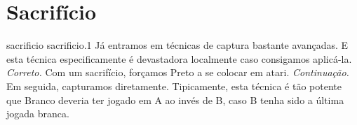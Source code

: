 \chapter{Sacrifício}

\emptypage

\problemAnswerDiagram
  {sacrificio}
  {sacrificio.1}
  {Já entramos em técnicas de captura bastante avançadas. E esta técnica especificamente é devastadora localmente caso consigamos aplicá-la.}
  {\emph{Correto.} Com um sacrifício, forçamos Preto a se colocar em atari.}
  {\emph{Continuação.} Em seguida, capturamos diretamente. Tipicamente, esta técnica é tão potente que Branco deveria ter jogado em A ao invés de B, caso B tenha sido a última jogada branca.}